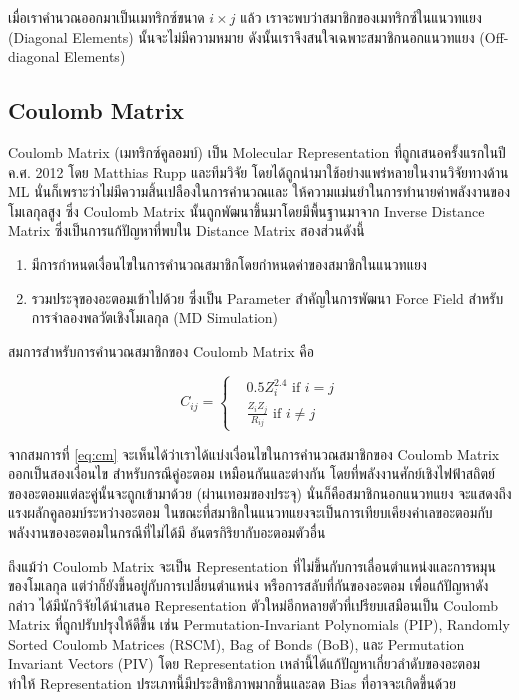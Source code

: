 เมื่อเราคำนวณออกมาเป็นเมทริกซ์ขนาด $i \times j$ แล้ว เราจะพบว่าสมาชิกของเมทริกซ์ในแนวทแยง (Diagonal Elements) นั้นจะไม่มีความหมาย 
ดังนั้นเราจึงสนใจเฉพาะสมาชิกนอกแนวทแยง (Off-diagonal Elements)

\subsection{Coulomb Matrix}

Coulomb Matrix (เมทริกซ์คูลอมบ์) เป็น Molecular Representation ที่ถูกเสนอครั้งแรกในปี ค.ศ. 2012 โดย Matthias Rupp 
และทีมวิจัย\citeauthor{rupp2012} โดยได้ถูกนำมาใช้อย่างแพร่หลายในงานวิจัยทางด้าน ML นั่นก็เพราะว่าไม่มีความสิ้นเปลืองในการคำนวณและ%
ให้ความแม่นยำในการทำนายค่าพลังงานของโมเลกุลสูง ซึ่ง Coulomb Matrix นั้นถูกพัฒนาขึ้นมาโดยมีพื้นฐานมาจาก Inverse Distance Matrix 
ซึ่งเป็นการแก้ปัญหาที่พบใน Distance Matrix สองส่วนดังนี้

\begin{enumerate}
    \item มีการกำหนดเงื่อนไขในการคำนวณสมาชิกโดยกำหนดค่าของสมาชิกในแนวทแยง
    \item รวมประจุของอะตอมเข้าไปด้วย ซึ่งเป็น Parameter สำคัญในการพัฒนา Force Field สำหรับการจำลองพลวัตเชิงโมเลกุล (MD Simulation)
\end{enumerate}

สมการสำหรับการคำนวณสมาชิกของ Coulomb Matrix คือ

\begin{equation}
    \label{eq:cm}
    C_{ij} =
    \begin{cases}
     & 0.5 Z_i^{2.4} \text{ if } i = j \\ 
     & \frac{Z_i Z_j}{R_{ij}} \text{ if } i \neq j
    \end{cases}
\end{equation}

จากสมการที่ \ref{eq:cm} จะเห็นได้ว่าเราได้แบ่งเงื่อนไขในการคำนวณสมาชิกของ Coulomb Matrix ออกเป็นสองเงื่อนไข สำหรับกรณีคู่อะตอม%
เหมือนกันและต่างกัน โดยที่พลังงานศักย์เชิงไฟฟ้าสถิตย์ของอะตอมแต่ละคู่นั้นจะถูกเข้ามาด้วย (ผ่านเทอมของประจุ) นั่นก็คือสมาชิกนอกแนวทแยง%
จะแสดงถึงแรงผลักคูลอมบ์ระหว่างอะตอม ในขณะที่สมาชิกในแนวทแยงจะเป็นการเทียบเคียงค่าเลขอะตอมกับพลังงานของอะตอมในกรณีที่ไม่ได้มี%
อันตรกิริยากับอะตอมตัวอื่น

ถึงแม้ว่า Coulomb Matrix จะเป็น Representation ที่ไม่ขึ้นกับการเลื่อนตำแหน่งและการหมุนของโมเลกุล แต่ว่าก็ยังขึ้นอยู่กับการเปลี่ยนตำแหน่ง%
หรือการสลับที่กันของอะตอม เพื่อแก้ปัญหาดังกล่าว ได้มีนักวิจัยได้นำเสนอ Representation ตัวใหม่อีกหลายตัวที่เปรียบเสมือนเป็น Coulomb Matrix 
ที่ถูกปรับปรุงให้ดีขึ้น เช่น Permutation-Invariant Polynomials (PIP)\cite{braams2009}, Randomly Sorted Coulomb Matrices 
(RSCM)\cite{hansen2013}, Bag of Bonds (BoB)\cite{hansen2013}, และ Permutation Invariant Vectors (PIV)\cite{gallet2013} 
โดย Representation เหล่านี้ได้แก้ปัญหาเกี่ยวลำดับของอะตอม ทำให้ Representation ประเภทนี้มีประสิทธิภาพมากขึ้นและลด Bias ที่อาจจะเกิดขึ้นด้วย

